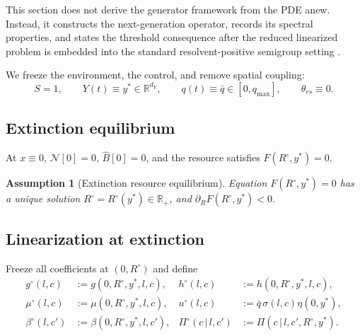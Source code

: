 \documentclass[pdflatex,sn-mathphys-num]{sn-jnl}%
\newtheorem{assumption}[theorem]{Assumption}
\begin{document}
This section does not derive the generator framework from the PDE anew. Instead, it constructs the next-generation operator, records its spectral properties, and states the threshold consequence after the reduced linearized problem is embedded into the standard resolvent-positive semigroup setting \cite{Thieme2009,wang2026algebraic,huo2025growth}.

We freeze the environment, the control, and remove spatial coupling:
\begin{equation}\label{eq:r0_reduction}
S=1,\qquad Y(t)\equiv y^\ast\in\mathbb R^{d_Y},\qquad
q(t)\equiv \bar q\in[0,q_{\max}],\qquad \theta_{rs}\equiv 0.
\end{equation}

\subsection{Extinction equilibrium}
At \(x\equiv 0\), \(\mathcal N[0]=0\), \(\widehat B[0]=0\), and the resource
satisfies \(F(R^\circ,y^\ast)=0\).
\begin{assumption}[Extinction resource equilibrium]\label{ass:r0_resource_eq}
Equation \(F(R^\circ,y^\ast)=0\) has a unique solution
\(R^\circ=R^\circ(y^\ast)\in\mathbb R_+\), and
\(\partial_R F(R^\circ,y^\ast)<0\).
\end{assumption}

\subsection{Linearization at extinction}
Freeze all coefficients at \((0,R^\circ)\) and define
\begin{align}
g^\circ(l,c)&:=g(0,R^\circ,y^\ast,l,c), &
h^\circ(l,c)&:=h(0,R^\circ,y^\ast,l,c), \label{eq:r0_gh0}\\
\mu^\circ(l,c)&:=\mu(0,R^\circ,y^\ast,l,c), &
u^\circ(l,c)&:=\bar q\,\sigma(l,c)\eta(0,y^\ast), \label{eq:r0_mu_u0}\\
\beta^\circ(l,c')&:=\beta(0,R^\circ,y^\ast,l,c'), &
\Pi^\circ(c\,|\,l,c')&:=\Pi(c\,|\,l,c',R^\circ,y^\ast). \label{eq:r0_beta_Pi0}
\end{align}
\end{document}

